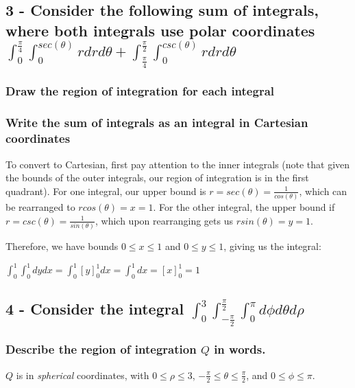\documentclass{article}
\begin{document}
\subsection{3 - Consider the following sum of integrals, where both integrals use polar coordinates $\int_{0}^{\frac{\pi}{4}}\int_{0}^{sec(\theta)}rdrd\theta + \int_{\frac{\pi}{4}}^{\frac{\pi}{2}}\int_{0}^{csc(\theta)}rdrd\theta$}
\subsubsection{Draw the region of integration for each integral}
\subsubsection{Write the sum of integrals as an integral in Cartesian coordinates}

\par\noindent\large To convert to Cartesian, first pay attention to the inner integrals (note that given the bounds of the outer integrals, our region of integration is in the first quadrant).  For one integral, our upper bound is $r = sec(\theta) = \frac{1}{cos(\theta)}$, which can be rearranged to $rcos(\theta) = x = 1$.  For the other integral, the upper bound if $r = csc(\theta) = \frac{1}{sin(\theta)}$, which upon rearranging gets us $rsin(\theta) = y = 1$.\vspace{0.25cm}

\par\noindent\large Therefore, we have bounds $0 \leq x \leq 1$ and $0 \leq y \leq 1$, giving us the integral:
\par\noindent\Large $\int_{0}^{1}\int_{0}^{1} dydx = \int_{0}^{1}[y]_{0}^{1}dx = \int_{0}^{1}dx = [x]_{0}^{1} = 1$

\subsection{4 - Consider the integral $\int_{0}^{3}\int_{-\frac{\pi}{2}}^{\frac{\pi}{2}}\int_{0}^{\pi}d\phi d\theta d\rho$}

\subsubsection{Describe the region of integration $Q$ in words.}

\par\noindent\large $Q$ is in \textit{spherical} coordinates, with $0 \leq \rho \leq 3$, $-\frac{\pi}{2} \leq \theta \leq \frac{\pi}{2}$, and $0 \leq \phi \leq \pi$.
\end{document}
